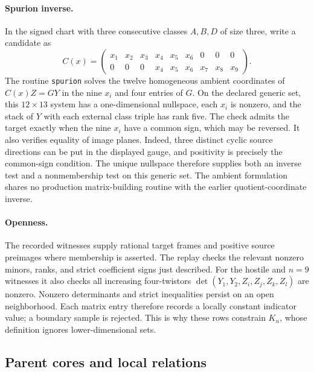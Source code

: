 \documentclass[11pt]{article}
\newcommand{\1}{\mathbf 1}
\begin{document}
\paragraph{Spurion inverse.}
In the signed chart with three consecutive classes $A,B,D$ of size three,
write a candidate as
\[
C(x)=
\begin{pmatrix}
x_1&x_2&x_3&x_4&x_5&x_6&0&0&0\\
0&0&0&x_4&x_5&x_6&x_7&x_8&x_9
\end{pmatrix}.
\]
The routine \texttt{spurion} solves the twelve homogeneous ambient
coordinates of $C(x)Z=GY$ in the nine $x_i$ and four entries of $G$.
On the declared generic set, this $12\times13$ system has a
one-dimensional nullspace, each $x_i$ is nonzero, and the stack of $Y$
with each external class triple has rank five.  The check admits the
target exactly when the nine $x_i$ have a common sign, which may be
reversed.  It also verifies equality of image planes.  Indeed, three
distinct cyclic source directions can be put in the displayed gauge,
and positivity is precisely the common-sign condition.  The unique
nullspace therefore supplies both an inverse test and a nonmembership
test on this generic set.  The ambient formulation shares no production
matrix-building routine with the earlier quotient-coordinate inverse.

\paragraph{Openness.}
The recorded witnesses supply rational target frames and positive source
preimages where membership is asserted.  The replay checks the relevant
nonzero minors, ranks, and strict coefficient signs just described.
For the hostile and $n=9$ witnesses it also checks all increasing
four-twistors $\det(Y_1,Y_2,Z_i,Z_j,Z_k,Z_l)$ are nonzero.
Nonzero determinants and strict inequalities persist on an open
neighborhood.  Each matrix entry therefore records a locally constant
indicator value; a boundary sample is rejected.  This is why these rows
constrain $K_n$, whose definition ignores lower-dimensional sets.

\subsection{Parent cores and local relations}
\label{cert:LOCAL-PARENTS}\label{cert:LOCAL-RELATIONS}
\label{cert:LOCAL-TEN-WALL}\label{cert:LOCAL-HOSTILE-8}
\label{cert:LOCAL-HOSTILE-9}
\end{document}
